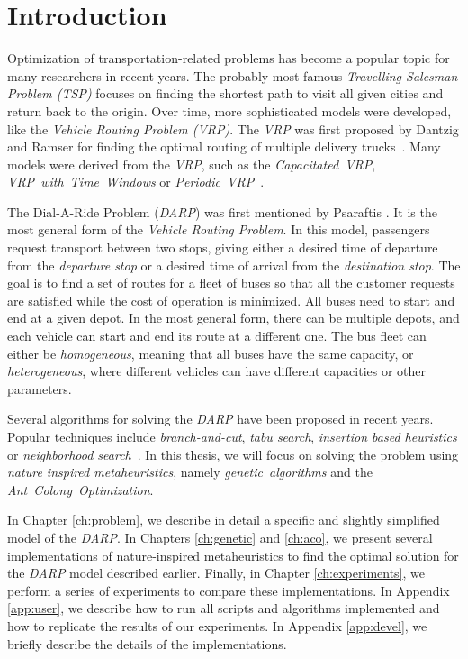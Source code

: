 \chapter*{Introduction}

Optimization of transportation-related problems has become a popular topic for many researchers in recent years. The probably most famous \textit{Travelling Salesman Problem (TSP)} focuses on finding the shortest path to visit all given cities and return back to the origin. Over time, more sophisticated models were developed, like the \textit{Vehicle Routing Problem (VRP)}. The \textit{VRP} was first proposed by Dantzig and Ramser for finding the optimal routing of multiple delivery trucks~\cite{Dantzig1959TheTD}. Many models were derived from the \textit{VRP}, such as the \textit{Capacitated~VRP}, \textit{VRP~with~Time~Windows} or \textit{Periodic~VRP}~\cite{VRPSurvey}.

The Dial-A-Ride Problem (\textit{DARP}) was first mentioned by Psaraftis \cite{psaraftis1980dynamic}. It is the most general form of the \textit{Vehicle Routing Problem}. In this model, passengers request transport between two stops, giving either a desired time of departure from the \textit{departure stop} or a desired time of arrival from the \textit{destination stop}. The goal is to find a set of routes for a fleet of buses so that all the customer requests are satisfied while the cost of operation is minimized. All buses need to start and end at a given depot. In the most general form, there can be multiple depots, and each vehicle can start and end its route at a different one. The bus fleet can either be \textit{homogeneous}, meaning that all buses have the same capacity, or \textit{heterogeneous}, where different vehicles can have different capacities or other parameters.

Several algorithms for solving the \textit{DARP} have been proposed in recent years. Popular techniques include \textit{branch-and-cut}, \textit{tabu search}, \textit{insertion based heuristics} or \textit{neighborhood search}~\cite{surveydarp}. In this thesis, we will focus on solving the problem using \textit{nature inspired metaheuristics}, namely \textit{genetic~algorithms} and the \textit{Ant~Colony~Optimization}.

In Chapter \ref{ch:problem}, we describe in detail a specific and slightly simplified model of the \textit{DARP}. In Chapters \ref{ch:genetic} and \ref{ch:aco}, we present several implementations of nature-inspired metaheuristics to find the optimal solution for the \textit{DARP} model described earlier. Finally, in Chapter \ref{ch:experiments}, we perform a series of experiments to compare these implementations. In Appendix \ref{app:user}, we describe how to run all scripts and algorithms implemented and how to replicate the results of our experiments. In Appendix \ref{app:devel}, we briefly describe the details of the implementations.
